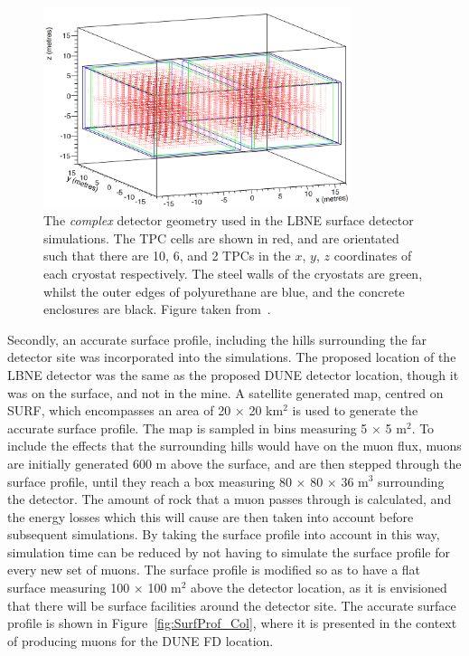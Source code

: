 \begin{figure}
  \centering
  \includegraphics[width=0.8\textwidth]{ComplexGeom}
  \caption[The \emph{complex} detector geometry used in the LBNE surface detector simulations]
          {The \emph{complex} detector geometry used in the LBNE surface detector simulations. The TPC cells are shown in red, and are orientated such that there are 10, 6, and 2 TPCs in the $x$, $y$, $z$ coordinates of each cryostat respectively. The steel walls of the cryostats are green, whilst the outer edges of polyurethane are blue, and the concrete enclosures are black. Figure taken from~\citep{MartinsThesis}.}
  \label{fig:SurfCompGeom}
\end{figure}

Secondly, an accurate surface profile, including the hills surrounding the far detector site was incorporated into the simulations. The proposed location of the LBNE detector was the same as the proposed DUNE detector location, though it was on the surface, and not in the mine. A satellite generated map, centred on SURF, which encompasses an area of 20 $\times$ 20 km$^2$ is used to generate the accurate surface profile. The map is sampled in bins measuring 5 $\times$ 5 m$^2$. To include the effects that the surrounding hills would have on the muon flux, muons are initially generated 600 m above the surface, and are then stepped through the surface profile, until they reach a box measuring 80 $\times$ 80 $\times$ 36 m$^3$ surrounding the detector. The amount of rock that a muon passes through is calculated, and the energy losses which this will cause are then taken into account before subsequent simulations. By taking the surface profile into account in this way, simulation time can be reduced by not having to simulate the surface profile for every new set of muons. The surface profile is modified so as to have a flat surface measuring 100 $\times$ 100 m$^2$ above the detector location, as it is envisioned that there will be surface facilities around the detector site. The accurate surface profile is shown in Figure~\ref{fig:SurfProf_Col}, where it is presented in the context of producing muons for the DUNE FD location. \\


